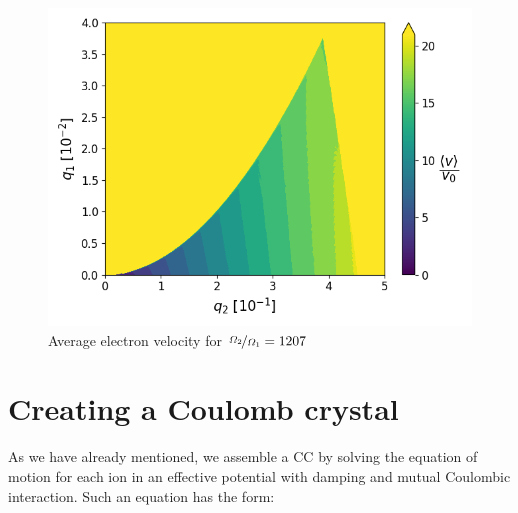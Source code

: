 \begin{figure}[H]
	\centering
	\includegraphics[width=\linewidth]{img/0_ions_1_electrons_q1_0.0-0.04_q2_0.0-0.5_360x360_1207.png}
	\caption{Average electron velocity for $\nicefrac{\Omega_2}{\Omega_1} = 1207$}
	\label{fig:vel-eta=1207}
\end{figure}

\section{Creating a Coulomb crystal}

As we have already mentioned, we assemble a CC by solving the equation of motion for each ion in an effective potential with damping and mutual Coulombic interaction. Such an equation has the form:

